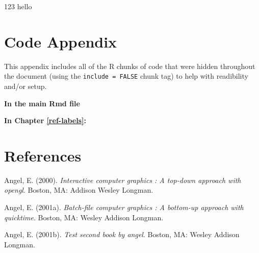 \documentclass[12pt,twoside]{dukestatscithesis}
\theoremstyle{definition}
\theoremstyle{definition}
\theoremstyle{definition}
\theoremstyle{remark}
\begin{document}
123 hello

\appendix

\chapter{Code Appendix}\label{code-appendix}

This appendix includes all of the R chunks of code that were hidden
throughout the document (using the \texttt{include\ =\ FALSE} chunk tag)
to help with readibility and/or setup.

\textbf{In the main Rmd file}
\begin{Shaded}
\begin{Highlighting}[]
  \NormalTok{(}\NormalTok{, } \NormalTok{)}
  \NormalTok{(}\NormalTok{)}
\end{Highlighting}
\end{Shaded}
\textbf{In Chapter \ref{ref-labels}:}

\backmatter

\chapter*{References}\label{references}


\noindent

\setlength{\parindent}{-0.20in} \setlength{\leftskip}{0.20in}
\setlength{\parskip}{8pt}

\hypertarget{refs}{}
\hypertarget{ref-angel2000}{}
Angel, E. (2000). \emph{Interactive computer graphics : A top-down
approach with opengl}. Boston, MA: Addison Wesley Longman.

\hypertarget{ref-angel2001}{}
Angel, E. (2001a). \emph{Batch-file computer graphics : A bottom-up
approach with quicktime}. Boston, MA: Wesley Addison Longman.

\hypertarget{ref-angel2002a}{}
Angel, E. (2001b). \emph{Test second book by angel}. Boston, MA: Wesley
Addison Longman.


\end{document}

